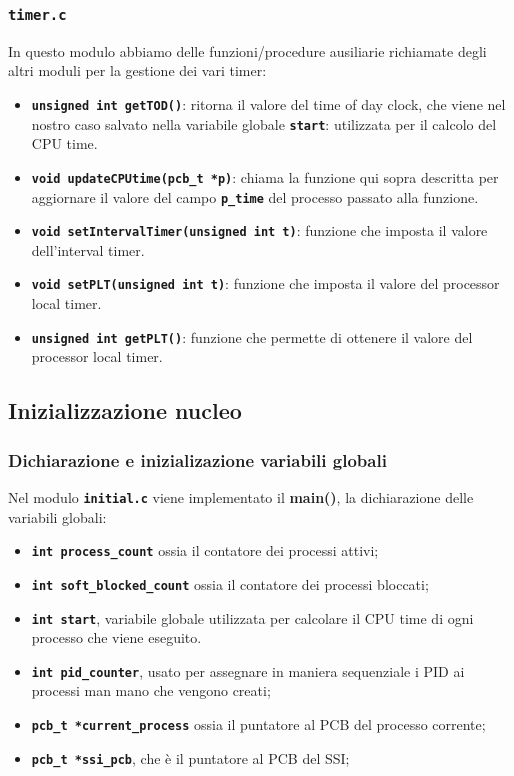 \documentclass{article}
\begin{document}
\subsubsection{\texttt{\textbf{timer.c}}}
In questo modulo abbiamo delle funzioni/procedure ausiliarie richiamate degli altri moduli per la gestione dei vari timer:
\begin{itemize}
  \item \texttt{\textbf{unsigned int getTOD()}}: ritorna il valore del time of day clock, che viene nel nostro caso salvato nella variabile globale \texttt{\textbf{start}}: utilizzata per il calcolo del CPU time.
    \item \texttt{\textbf{void updateCPUtime(pcb\_t *p)}}: chiama la funzione qui sopra descritta per aggiornare il valore 
      del campo \texttt{\textbf{p\_time}} del processo passato alla funzione.
    \item \texttt{\textbf{void setIntervalTimer(unsigned int t)}}: funzione che imposta il valore dell'interval timer. 
    \item \texttt{\textbf{void setPLT(unsigned int t)}}: funzione che imposta il valore del processor local timer.
    \item \texttt{\textbf{unsigned int getPLT()}}: funzione che permette di ottenere il valore del processor local timer.
\end{itemize}

\subsection{Inizializzazione nucleo}
\subsubsection{Dichiarazione e inizializazione variabili globali}
Nel modulo \texttt{\textbf{initial.c}} viene implementato il \textbf{main()}, la dichiarazione delle variabili globali:
\begin{itemize}
    \item \texttt{\textbf{int process\_count}} ossia il contatore dei processi attivi;
    \item \texttt{\textbf{int soft\_blocked\_count}} ossia il contatore dei processi bloccati;
    \item \texttt{\textbf{int start}}, variabile globale utilizzata per calcolare il CPU time di ogni processo che viene eseguito.
    \item \texttt{\textbf{int pid\_counter}}, usato per assegnare in maniera sequenziale i PID ai processi man mano che vengono creati;
    \item \texttt{\textbf{pcb\_t *current\_process}} ossia il puntatore al PCB del processo corrente;
    \item \texttt{\textbf{pcb\_t *ssi\_pcb}}, che è il puntatore al PCB del SSI;
    
\end{itemize}
\end{document}
